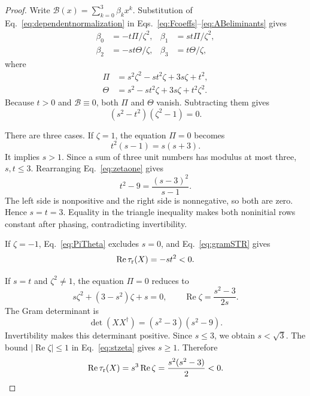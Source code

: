 \documentclass[aps,prx,reprint,nofootinbib,twoside,superscriptaddress,longbibliography,floatfix]{revtex4-2}
\theoremstyle{definition}
\newcommand{\RePart}{\operatorname{Re}}
\begin{document}
\begin{proof}
Write $\mathcal B(x)=\sum_{k=0}^{3}\beta_kx^k$.  Substitution of Eq.~\eqref{eq:dependentnormalization} in Eqs.~\eqref{eq:Fcoeffs}--\eqref{eq:ABeliminants} gives
\begin{equation}
\begin{aligned}
\beta_0&=-t\Pi/\zeta^2,&
\beta_1&=st\Pi/\zeta^2,\\
\beta_2&=-st\Theta/\zeta,&
\beta_3&=t\Theta/\zeta,
\end{aligned}
\label{eq:dependentbetas}
\end{equation}
where
\begin{equation}
\begin{aligned}
\Pi&=s^2\zeta^2-st^2\zeta+3s\zeta+t^2,\\
\Theta&=s^2-st^2\zeta+3s\zeta+t^2\zeta^2.
\end{aligned}
\label{eq:PiTheta}
\end{equation}
Because $t>0$ and $\mathcal B\equiv0$, both $\Pi$ and $\Theta$ vanish. Subtracting them gives
\begin{equation}
(s^2-t^2)(\zeta^2-1)=0.
\label{eq:dependentfactor}
\end{equation}

There are three cases.  If $\zeta=1$, the equation $\Pi=0$ becomes
\begin{equation}
t^2(s-1)=s(s+3).
\label{eq:zetaone}
\end{equation}
It implies $s>1$.  Since a sum of three unit numbers has modulus at most three, $s,t\leq3$.  Rearranging Eq.~\eqref{eq:zetaone} gives
\begin{equation}
t^2-9=\frac{(s-3)^2}{s-1}.
\label{eq:zetaonebound}
\end{equation}
The left side is nonpositive and the right side is nonnegative, so both are zero.  Hence $s=t=3$.  Equality in the triangle inequality makes both noninitial rows constant after phasing, contradicting invertibility.

If $\zeta=-1$, Eq.~\eqref{eq:PiTheta} excludes $s=0$, and Eq.~\eqref{eq:gramSTR} gives
\begin{equation}
\RePart\tau_{\rm r}(X)=-st^2<0.
\label{eq:zetaminustau}
\end{equation}

If $s=t$ and $\zeta^2\neq1$, the equation $\Pi=0$ reduces to
\begin{equation}
s\zeta^2+(3-s^2)\zeta+s=0,
\qquad
\RePart\zeta=\frac{s^2-3}{2s}.
\label{eq:stzeta}
\end{equation}
The Gram determinant is
\begin{equation}
\det(XX^{\dagger})=(s^2-3)(s^2-9).
\label{eq:dependentdet}
\end{equation}
Invertibility makes this determinant positive.  Since $s\leq3$, we obtain $s<\sqrt3$.  The bound $|\RePart\zeta|\leq1$ in Eq.~\eqref{eq:stzeta} gives $s\geq1$.  Therefore
\begin{equation}
\RePart\tau_{\rm r}(X)
=s^3\RePart\zeta
=\frac{s^2(s^2-3)}{2}<0.
\label{eq:dependentnegative}
\end{equation}


\end{proof}
\end{document}
